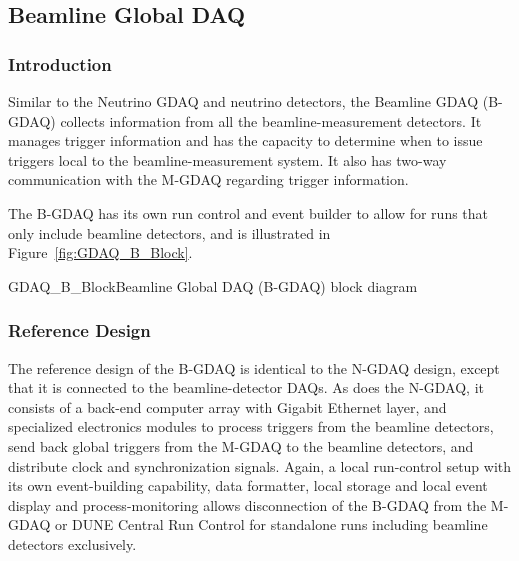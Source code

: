 \subsection{Beamline Global DAQ}
\label{subsec:B-GDAQ}

\subsubsection{Introduction} %
Similar to the Neutrino GDAQ and neutrino detectors, the Beamline GDAQ (B-GDAQ) collects 
information from all %
the beamline-measurement detectors.
 It manages trigger information and has the capacity 
to determine when to issue triggers local to the beamline-measurement system. It 
also has two-way communication with the %
M-GDAQ %
regarding trigger 
information.

The B-GDAQ has its own run control and event builder to allow for runs that 
only include beamline detectors, and is illustrated in Figure~\ref{fig:GDAQ_B_Block}.

\begin{cdrfigure}{GDAQ_B_Block}{Beamline Global DAQ (B-GDAQ) block 
diagram}
\end{cdrfigure}

\subsubsection{Reference Design}

The reference design of the B-GDAQ is %
identical to the 
N-GDAQ design, except that it is connected to the beamline-detector DAQs. 
As does the N-GDAQ, it 
consists of a back-end computer array with Gigabit Ethernet layer, 
and specialized electronics modules to process triggers from the 
beamline detectors, send back global triggers from the %
M-GDAQ  %
to the 
beamline detectors, and distribute clock and synchronization signals. 
Again, a local run-control setup with its own event-building capability, 
data formatter, local storage and local event display and process-monitoring 
allows disconnection of the B-GDAQ from the %
M-GDAQ  %
or DUNE 
Central Run Control for standalone runs including beamline 
detectors exclusively.


